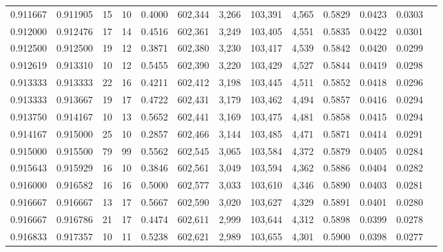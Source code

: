 \begin{tabular}{rrrrrrrrrrrrr}
0.911667 & 0.911905 &    15 &  10 &                                     0.4000 & 602,344 &   3,266 & 103,391 &   4,565 & 0.5829 & 0.0423 & 0.0303 \\
0.912000 & 0.912476 &    17 &  14 &                                     0.4516 & 602,361 &   3,249 & 103,405 &   4,551 & 0.5835 & 0.0422 & 0.0301 \\
0.912500 & 0.912500 &    19 &  12 &                                     0.3871 & 602,380 &   3,230 & 103,417 &   4,539 & 0.5842 & 0.0420 & 0.0299 \\
0.912619 & 0.913310 &    10 &  12 &                                     0.5455 & 602,390 &   3,220 & 103,429 &   4,527 & 0.5844 & 0.0419 & 0.0298 \\
0.913333 & 0.913333 &    22 &  16 &                                     0.4211 & 602,412 &   3,198 & 103,445 &   4,511 & 0.5852 & 0.0418 & 0.0296 \\
0.913333 & 0.913667 &    19 &  17 &                                     0.4722 & 602,431 &   3,179 & 103,462 &   4,494 & 0.5857 & 0.0416 & 0.0294 \\
0.913750 & 0.914167 &    10 &  13 &                                     0.5652 & 602,441 &   3,169 & 103,475 &   4,481 & 0.5858 & 0.0415 & 0.0294 \\
0.914167 & 0.915000 &    25 &  10 &                                     0.2857 & 602,466 &   3,144 & 103,485 &   4,471 & 0.5871 & 0.0414 & 0.0291 \\
0.915000 & 0.915500 &    79 &  99 &                                     0.5562 & 602,545 &   3,065 & 103,584 &   4,372 & 0.5879 & 0.0405 & 0.0284 \\
0.915643 & 0.915929 &    16 &  10 &                                     0.3846 & 602,561 &   3,049 & 103,594 &   4,362 & 0.5886 & 0.0404 & 0.0282 \\
0.916000 & 0.916582 &    16 &  16 &                                     0.5000 & 602,577 &   3,033 & 103,610 &   4,346 & 0.5890 & 0.0403 & 0.0281 \\
0.916667 & 0.916667 &    13 &  17 &                                     0.5667 & 602,590 &   3,020 & 103,627 &   4,329 & 0.5891 & 0.0401 & 0.0280 \\
0.916667 & 0.916786 &    21 &  17 &                                     0.4474 & 602,611 &   2,999 & 103,644 &   4,312 & 0.5898 & 0.0399 & 0.0278 \\
0.916833 & 0.917357 &    10 &  11 &                                     0.5238 & 602,621 &   2,989 & 103,655 &   4,301 & 0.5900 & 0.0398 & 0.0277 \\

\end{tabular}
